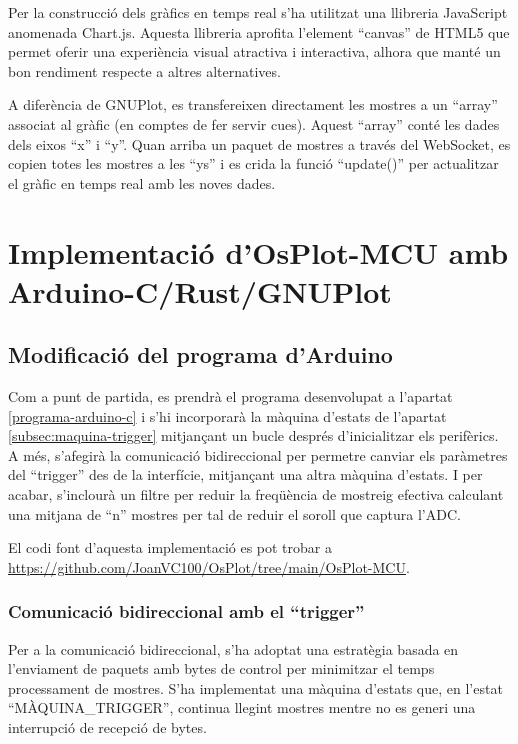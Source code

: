 \documentclass{tfgitic}[2023/06/30]
\begin{document}
Per la construcció dels gràfics en temps real s'ha utilitzat una
llibreria JavaScript anomenada Chart.js. Aquesta llibreria aprofita
l'element ``canvas'' de HTML5 que permet oferir una experiència visual
atractiva i interactiva, alhora que manté un bon rendiment respecte a
altres alternatives.

A diferència de GNUPlot, es transfereixen directament les mostres a un
``array'' associat al gràfic (en comptes de fer servir cues). Aquest
``array'' conté les dades dels eixos ``x'' i ``y''. Quan arriba un
paquet de mostres a través del WebSocket, es copien totes les mostres
a les ``ys'' i es crida la funció ``update()'' per actualitzar el
gràfic en temps real amb les noves dades.

\chapter{Implementació d'OsPlot-MCU amb Arduino-C/Rust/GNUPlot}

\section{Modificació del programa d'Arduino}

Com a punt de partida, es prendrà el programa desenvolupat a l'apartat
\ref{programa-arduino-c} i s'hi incorporarà la màquina d'estats de
l'apartat \ref{subsec:maquina-trigger} mitjançant un bucle després
d'inicialitzar els perifèrics. A més, s'afegirà la
comunicació bidireccional per permetre canviar els paràmetres del
``trigger'' des de la interfície, mitjançant una altra màquina
d'estats.  I per acabar, s'inclourà un filtre per reduir la freqüència
de mostreig efectiva calculant una mitjana de ``n'' mostres per tal de
reduir el soroll que captura l'ADC.

El codi font d'aquesta implementació es pot trobar a
\url{https://github.com/JoanVC100/OsPlot/tree/main/OsPlot-MCU}.

\subsection{Comunicació bidireccional amb el ``trigger''}

Per a la comunicació bidireccional, s'ha adoptat una estratègia basada
en l'enviament de paquets amb bytes de control per minimitzar el temps
processament de mostres. S'ha implementat una màquina d'estats que, en
l'estat ``MÀQUINA\_TRIGGER'', continua llegint mostres mentre no es
generi una interrupció de recepció de bytes.
\end{document}
